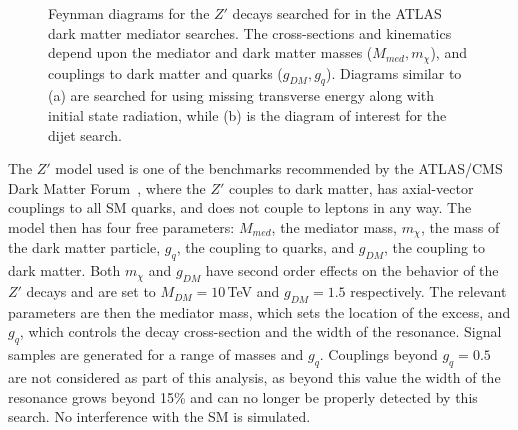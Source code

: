 \begin{figure}[]
	\centering
	\hspace{0.1\textwidth}%
	\caption{Feynman diagrams for the $Z'$ decays searched for in the ATLAS dark matter mediator searches.  The cross-sections and kinematics depend upon the mediator and dark matter masses ($M_{med}, m_\chi$), and couplings to dark matter and quarks ($g_{DM}, g_q$). Diagrams similar to (a) are searched for using missing transverse energy along with initial state radiation, while (b) is the diagram of interest for the dijet search.
	}
	\label{fig:ZPrimeFeynman}
\end{figure} 

The $Z'$ model used is one of the benchmarks recommended by the ATLAS/CMS Dark Matter Forum~\cite{DMForum}, where the $Z'$ couples to dark matter, has axial-vector couplings to all SM quarks, and does not couple to leptons in any way.  The model then has four free parameters: $M_{med}$, the mediator mass, $m_\chi$, the mass of the dark matter particle, $g_q$, the coupling to quarks, and $g_{DM}$, the coupling to dark matter.  Both $m_\chi$ and $g_{DM}$ have second order effects on the behavior of the $Z'$ decays and are set to $M_{DM} = 10$\,TeV and $g_{DM} = 1.5$ respectively.  The relevant parameters are then the mediator mass, which sets the location of the excess, and $g_q$, which controls the decay cross-section and the width of the resonance.  Signal samples are generated for a range of masses and $g_q$.  Couplings beyond $g_q = 0.5$ are not considered as part of this analysis, as beyond this value the width of the resonance grows beyond 15\% and can no longer be properly detected by this search.  No interference with the SM is simulated.


